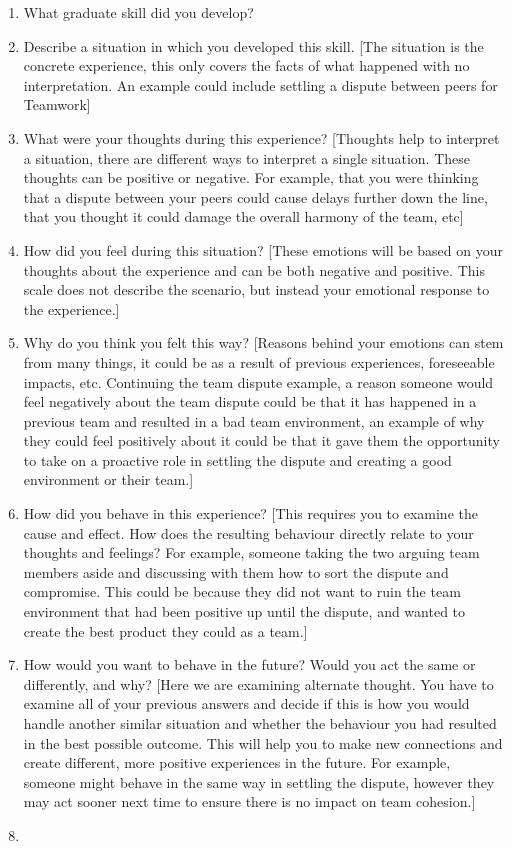 \documentclass{l4proj}
\begin{document}
\begin{appendices}
\begin{enumerate}
    \item What graduate skill did you develop?
    \item Describe a situation in which you developed this skill. [The situation is the concrete experience, this only covers the facts of what happened with no interpretation. An example could include settling a dispute between peers for Teamwork]
    \item What were your thoughts during this experience? [Thoughts help to interpret a situation, there are different ways to interpret a single situation. These thoughts can be positive or negative. For example, that you were thinking that a dispute between your peers could cause delays further down the line, that you thought it could damage the overall harmony of the team, etc]
    \item How did you feel during this situation? [These emotions will be based on your thoughts about the experience and can be both negative and positive. This scale does not describe the scenario, but instead your emotional response to the experience.]
    \item Why do you think you felt this way? [Reasons behind your emotions can stem from many things, it could be as a result of previous experiences, foreseeable impacts, etc. Continuing the team dispute example, a reason someone would feel negatively about the team dispute could be that it has happened in a previous team and resulted in a bad team environment, an example of why they could feel positively about it could be that it gave them the opportunity to take on a proactive role in settling the dispute and creating a good environment or their team.]
    \item How did you behave in this experience? [This requires you to examine the cause and effect.  How does the resulting behaviour directly relate to your thoughts and feelings? For example, someone taking the two arguing team members aside and discussing with them how to sort the dispute and compromise. This could be because they did not want to ruin the team environment that had been positive up until the dispute, and wanted to create the best product they could as a team.]
    \item How would you want to behave in the future? Would you act the same or differently, and why? [Here we are examining alternate thought. You have to examine all of your previous answers and decide if this is how you would handle another similar situation and whether the behaviour you had resulted in the best possible outcome. This will help you to make new connections and create different, more positive experiences in the future. For example, someone might behave in the same way in settling the dispute, however they may act sooner next time to ensure there is no impact on team cohesion.]
    \item 
\end{enumerate}


\end{appendices}
\end{document}
